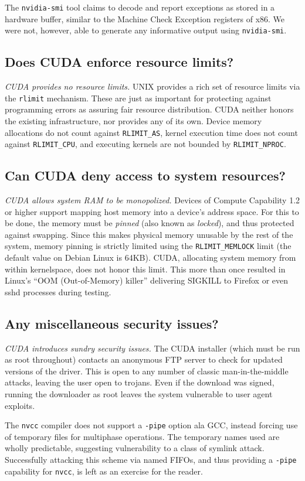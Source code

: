 \documentclass[letterpaper,10pt]{article}
\begin{document}
\begin{multicols}{2}
The \texttt{nvidia-smi} tool claims to decode and report exceptions as stored
in a hardware buffer, similar to the Machine Check Exception registers of x86.
We were not, however, able to generate any informative output using \texttt{nvidia-smi}.
\subsection{Does CUDA enforce resource limits?}
\textit{CUDA provides no resource limits.} UNIX provides a rich set of resource
limits via the \texttt{rlimit} mechanism. These are just as important for
protecting against programming errors as assuring fair resource distribution.
CUDA neither honors the existing infrastructure, nor provides any of its own.
Device memory allocations do not count against \texttt{RLIMIT\_AS}, kernel
execution time does not count against \texttt{RLIMIT\_CPU}, and executing
kernels are not bounded by \texttt{RLIMIT\_NPROC}.
\subsection{Can CUDA deny access to system resources?}
\textit{CUDA allows system RAM to be monopolized.} Devices of Compute Capability
1.2 or higher support mapping host memory into a device's address space. For this
to be done, the memory must be \textit{pinned} (also known as \textit{locked}), and
thus protected against swapping. Since this makes physical memory unusable by the
rest of the system, memory pinning is strictly limited using the \texttt{RLIMIT\_MEMLOCK}
limit (the default value on Debian Linux is 64KB). CUDA, allocating system memory
from within kernelspace, does not honor this limit. This more than once resulted in
Linux's ``OOM (Out-of-Memory) killer'' delivering SIGKILL to Firefox or even sshd
processes during testing.
\subsection{Any miscellaneous security issues?}
\textit{CUDA introduces sundry security issues.} The CUDA installer (which
must be run as root throughout) contacts an anonymous FTP server to check for
updated versions of the driver. This is open to any number of classic man-in-the-middle
attacks, leaving the user open to trojans. Even if the download was signed,
running the downloader as root leaves the system vulnerable to user agent
exploits.

The \texttt{nvcc} compiler does not support a \texttt{-pipe} option ala GCC,
instead forcing use of temporary files for multiphase operations. The temporary
names used are wholly predictable, suggesting vulnerability to a class of
symlink attack. Successfully attacking this scheme via named FIFOs, and thus
providing a \texttt{-pipe} capability for \texttt{nvcc}, is left as an exercise
for the reader.


\end{multicols}
\end{document}
